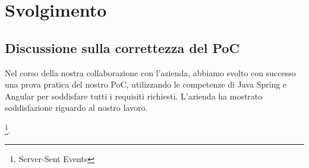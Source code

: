\section{Svolgimento}

\subsection{Discussione sulla correttezza del PoC}Nel corso della nostra collaborazione con l'azienda, abbiamo svolto con successo una prova pratica del nostro PoC, utilizzando le competenze di Java Spring e Angular per soddisfare tutti i requisiti richiesti. L'azienda ha mostrato soddisfazione riguardo al nostro lavoro.

\footnote{Server-Sent Events}.